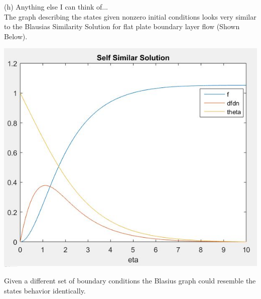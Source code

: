 \documentclass[paper=a4,margin, fontsize=11pt]{scrartcl} %
\numberwithin{equation}{section} %
\numberwithin{figure}{section} %
\numberwithin{table}{section} %
\begin{document}
(h) Anything else I can think of...\\
The graph describing the states given nonzero initial conditions looks very similar to the Blausias Similarity Solution for flat plate boundary layer flow (Shown Below).
\begin{center}
	{\includegraphics{Blasius}}
\end{center} 
Given a different set of boundary conditions the Blasius graph could resemble the states behavior identically.\\ 
\end{document}
